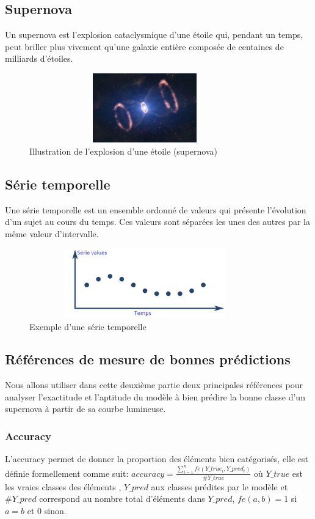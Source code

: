 \documentclass[french]{report}
\begin{document}
\subsection*{Supernova}
Un supernova est l'explosion cataclysmique d'une étoile qui, pendant un temps, peut briller plus vivement qu'une galaxie entière composée de centaines de milliards d'étoiles.
\begin{figure}[H]
	\centering
	\includegraphics[width=10cm, height=3cm]{images/supernova.jpg}
	\caption{Illustration  de l'explosion d'une étoile (supernova)}
\end{figure}
\subsection*{Série temporelle}
Une série temporelle est un ensemble ordonné de valeurs qui présente l'évolution d'un sujet au cours du temps. Ces valeurs sont séparées les unes des autres par la même valeur d'intervalle.
\begin{figure}[H]
	\centering
	\includegraphics[width=10cm, height=3cm]{images/series.png}
	\caption{Exemple d'une série temporelle}
\end{figure}
\subsection*{Références de mesure de bonnes prédictions}
Nous allons utiliser dans cette deuxième partie deux principales références pour analyser l'exactitude et l'aptitude du modèle à bien prédire la bonne classe d'un supernova à partir de sa courbe lumineuse.
\subsubsection{Accuracy}
L'accuracy  permet de donner la proportion des éléments bien catégorisés, elle est définie formellement comme suit: $accuracy = \frac{\sum_{i = 1}^{n} fe(Y\_true_i, Y\_pred_i)}{\#Y\_true}$ où  $Y\_true$ est les vraies classes des éléments , $Y\_pred$ aux classes prédites par le modèle et $\#Y\_pred$ correspond au nombre total d'éléments dans $Y\_pred$, $fe(a, b) = 1$ si $a = b$ et $0$ sinon.
\end{document}
